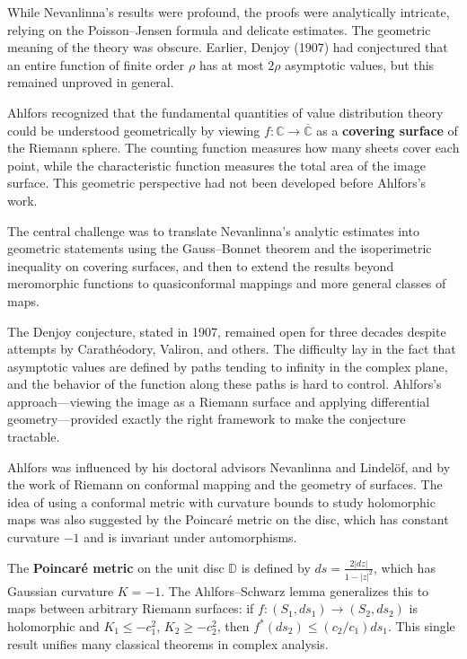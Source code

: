 While Nevanlinna's results were profound, the proofs were analytically intricate, relying on the Poisson--Jensen formula and delicate estimates. The geometric meaning of the theory was obscure. Earlier, Denjoy (1907) had conjectured that an entire function of finite order $\rho$ has at most $2\rho$ asymptotic values, but this remained unproved in general.

Ahlfors recognized that the fundamental quantities of value distribution theory could be understood geometrically by viewing $f: \mathbb{C} \to \overline{\mathbb{C}}$ as a \textbf{covering surface} of the Riemann sphere. The counting function measures how many sheets cover each point, while the characteristic function measures the total area of the image surface. This geometric perspective had not been developed before Ahlfors's work.

The central challenge was to translate Nevanlinna's analytic estimates into geometric statements using the Gauss--Bonnet theorem and the isoperimetric inequality on covering surfaces, and then to extend the results beyond meromorphic functions to quasiconformal mappings and more general classes of maps.

The Denjoy conjecture, stated in 1907, remained open for three decades despite attempts by Carath\'{e}odory, Valiron, and others. The difficulty lay in the fact that asymptotic values are defined by paths tending to infinity in the complex plane, and the behavior of the function along these paths is hard to control. Ahlfors's approach---viewing the image as a Riemann surface and applying differential geometry---provided exactly the right framework to make the conjecture tractable.

Ahlfors was influenced by his doctoral advisors Nevanlinna and Lindel\"{o}f, and by the work of Riemann on conformal mapping and the geometry of surfaces. The idea of using a conformal metric with curvature bounds to study holomorphic maps was also suggested by the Poincar\'{e} metric on the disc, which has constant curvature $-1$ and is invariant under automorphisms.

The \textbf{Poincar\'{e} metric} on the unit disc $\mathbb{D}$ is defined by $ds = \frac{2|dz|}{1-|z|^2}$, which has Gaussian curvature $K = -1$. The Ahlfors--Schwarz lemma generalizes this to maps between arbitrary Riemann surfaces: if $f: (S_1, ds_1) \to (S_2, ds_2)$ is holomorphic and $K_1 \leq -c_1^2$, $K_2 \geq -c_2^2$, then $f^*(ds_2) \leq (c_2/c_1) ds_1$. This single result unifies many classical theorems in complex analysis.

